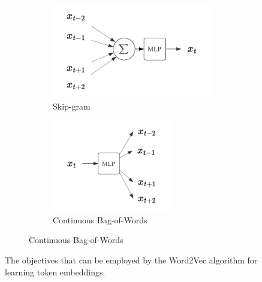 \begin{figure}[h]
    \centering

    \begin{subfigure}{\textwidth}
        \centering
        \begin{subfigure}{0.45\textwidth}
            \centering
            \includegraphics[width=\textwidth]{img/skipgram.pdf}
            \caption{Skip-gram}
            \label{fig:skipgram}
        \end{subfigure}
        \hspace{-20px}
        \begin{subfigure}{0.45\textwidth}
            \centering
            \includegraphics[width=0.75\textwidth]{img/cbow.pdf}
            \caption{Continuous Bag-of-Words}
            \label{fig:cbow}
        \end{subfigure}
    \end{subfigure}
    \caption{The objectives that can be employed by the Word2Vec algorithm for learning token embeddings.}
    \label{fig:word2vec}
\end{figure}


